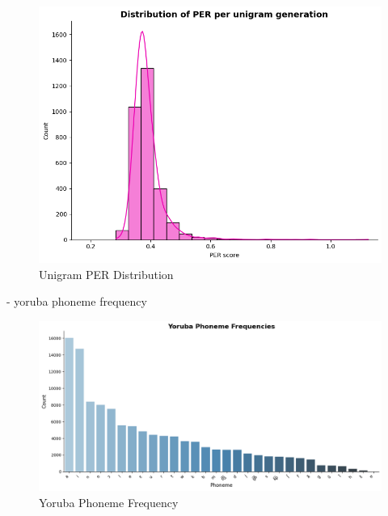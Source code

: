 \documentclass[11pt]{article}
\begin{document}
{\begin{figure}
    \centering
    \includegraphics[width=0.75\linewidth]{unigram_PER_distribution.png}
    \caption{Unigram PER Distribution}
    \label{fig:placeholder}
\end{figure}

- yoruba phoneme frequency
\begin{figure}
    \centering
 \includegraphics[width=1\linewidth]{YorPhonemeFrequency.png}
    \caption{Yoruba Phoneme Frequency}
    \label{fig:placeholder}
\end{figure}

}
\end{document}
